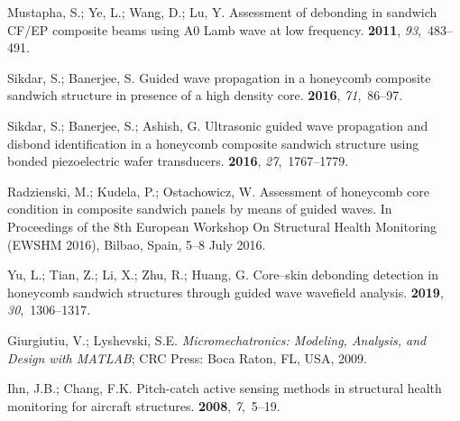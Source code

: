\documentclass[sensors,article,accept,moreauthors,pdftex]{Definitions/mdpi}
\begin{document}
\begin{thebibliography}{999}

Mustapha, S.; Ye, L.; Wang, D.; Lu, Y.
\newblock Assessment of debonding in sandwich CF/EP composite beams using A0
  Lamb wave at low frequency.
 {\bf 2011}, {\em 93},~483--491.

Sikdar, S.; Banerjee, S.
\newblock Guided wave propagation in a honeycomb composite sandwich structure
  in presence of a high density core.
 {\bf 2016}, {\em 71},~86--97.

Sikdar, S.; Banerjee, S.; Ashish, G.
\newblock Ultrasonic guided wave propagation and disbond identification in a
  honeycomb composite sandwich structure using bonded piezoelectric wafer
  transducers.
 {\bf 2016}, {\em 27},~1767--1779.

Radzienski, M.; Kudela, P.; Ostachowicz, W.
\newblock Assessment of honeycomb core condition in composite sandwich panels
  by means of guided waves.
\newblock  In Proceedings of the 8th European Workshop On Structural Health Monitoring
  (EWSHM 2016), Bilbao, Spain, {5--8 July} 2016. %


Yu, L.; Tian, Z.; Li, X.; Zhu, R.; Huang, G.
\newblock Core--skin debonding detection in honeycomb sandwich structures
  through guided wave wavefield analysis.
 {\bf 2019}, {\em 30},~1306--1317.

Giurgiutiu, V.; Lyshevski, S.E.
\newblock \emph{Micromechatronics: Modeling, Analysis, and Design with
  {MATLAB}{\textsuperscript{\textregistered}}}; CRC Press: Boca Raton, FL, USA, %
 2009.

Ihn, J.B.; Chang, F.K.
\newblock Pitch-catch active sensing methods in structural health monitoring
  for aircraft structures.
 {\bf 2008}, {\em 7},~5--19.


\end{thebibliography}
\end{document}
